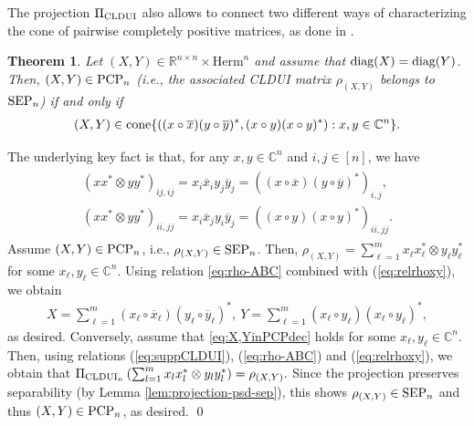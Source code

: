 \documentclass[11pt]{article}
\makeatletter
\newcommand{\R}{\ensuremath{\mathbb{R}}}   %
\newcommand{\C}{\ensuremath{\mathbb{C}}} %
\newcommand{\Herm}{\mathrm{Herm}}
\newcommand{\PCP}{\text{\rm PCP}}
\newcommand{\SEP}{\text{\rm SEP}}
\newcommand{\CLDUI}{\text{\rm CLDUI}}
\newcommand{\cone}{\text{\rm cone}}
\newcommand{\diag}{\text{\rm diag}}
\newcommand{\ot}{\otimes}
\newcommand{\ovx}{\overline x}
\newcommand{\ovy}{\overline y}
\theoremstyle{plain}
\newtheorem{theorem}[satz]{Theorem}
\renewenvironment{proof}[1][\proofname]{%
  \par
  \pushQED{}%
  \normalfont
  \topsep6\p@\@plus6\p@
  \trivlist
  \item[\hskip\labelsep\itshape #1\@addpunct{.}]%
}{%
  \popQED
  \endtrivlist
}
\makeatother
\begin{document}
The projection $\Pi_{\CLDUI}$ also allows to connect two different ways of characterizing the cone of pairwise completely positive matrices, as  done in \cite{JML-PCP}.

\begin{theorem}\label{theo:PCPDec}\cite{JML-PCP}
    Let $(X,Y)\in\R^{n\times n}\times \Herm^n$ and assume that  $\diag(X)=\diag(Y)$. Then, $(X,Y)\in\PCP_n$ (i.e., the associated CLDUI matrix $\rho_{(X,Y)}$ belongs to $\SEP_n$) if and only if 
    \begin{align}\label{eq:PCPDec}
        (X,Y)\in\cone\{((x\circ \overline{x})(y\circ \overline{y})^*,(x\circ y)(x\circ y)^*):x,y\in\C^n\}.
    \end{align}
\end{theorem}

\begin{proof} The underlying key fact is that, for any $x,y\in\C^n$ and  $i,j\in [n]$,  we have
\begin{align}\label{eq:relrhoxy}
\begin{split}
(xx^*\ot yy^*)_{ij,ij}= x_i\ovx_i y_j\ovy_j=((x\circ \ovx)(y\circ \ovy)^*)_{i,j},\\
(xx^*\ot yy^*)_{ii,jj}=x_i\ovx_jy_i\ovy_j= ((x\circ y) (x\circ y)^*)_{ii,jj}.
\end{split}
\end{align}
Assume $(X,Y)\in\PCP_n$, i.e., $\rho_{(X,Y)}\in\SEP_n$. Then, $\rho_{(X,Y)}=\sum_{\ell=1}^{m}x_\ell x_\ell^*\ot y_\ell y_\ell^*$ for some $x_\ell,y_\ell\in\C^n$.
Using relation \eqref{eq:rho-ABC} combined with (\ref{eq:relrhoxy}), we obtain
    \begin{align}\label{eq:X,YinPCPdec}
      X=\sum_{\ell=1}^m (x_\ell\circ \overline{x}_\ell)(y_\ell\circ \overline{y}_\ell)^*,\ Y=\sum_{\ell=1}^m(x_\ell\circ y_\ell)(x_\ell\circ y_\ell)^*,
    \end{align}
as desired.    Conversely, assume that \eqref{eq:X,YinPCPdec} holds for some $x_\ell,y_\ell\in\C^n$. 
Then,  using  relations (\ref{eq:suppCLDUI}), (\ref{eq:rho-ABC}) and (\ref{eq:relrhoxy}), we obtain that 
 $\Pi_{\CLDUI_n}\left(\sum_{l=1}^{m}x_lx_l^*\ot y_ly_l^*\right)=\rho_{(X,Y)}.$
Since the projection preserves separability (by Lemma \ref{lem:projection-psd-sep}), 
 this shows    $\rho_{(X,Y)}\in\SEP_n$ and thus $(X,Y)\in \PCP_n$, as desired.
\qed\end{proof}
\end{document}
